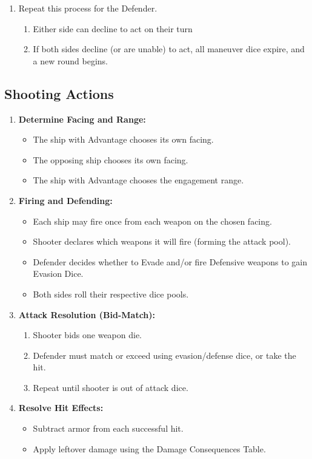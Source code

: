 \documentclass[11pt]{article}
\begin{document}
\begin{enumerate}
    \item Repeat this process for the Defender.
	\begin{enumerate}
		\item Either side can decline to act on their turn
		\item If both sides decline (or are unable) to act, all maneuver dice expire, and a new round begins.
	\end{enumerate}
\end{enumerate}

\subsection{Shooting Actions}

\begin{enumerate}
    \item \textbf{Determine Facing and Range:}
    \begin{itemize}
        \item The ship with Advantage chooses its own facing.
        \item The opposing ship chooses its own facing.
		\item The ship with Advantage chooses the engagement range.
    \end{itemize}

    \item \textbf{Firing and Defending:}
    \begin{itemize}
        \item Each ship may fire once from each weapon on the chosen facing.
        \item Shooter declares which weapons it will fire (forming the attack pool).
        \item Defender decides whether to Evade and/or fire Defensive weapons to gain Evasion Dice.
        \item Both sides roll their respective dice pools.
    \end{itemize}

    \item \textbf{Attack Resolution (Bid-Match):}
    \begin{enumerate}
        \item Shooter bids one weapon die.
        \item Defender must match or exceed using evasion/defense dice, or take the hit.
        \item Repeat until shooter is out of attack dice.
    \end{enumerate}

    \item \textbf{Resolve Hit Effects:}
    \begin{itemize}
        \item Subtract armor from each successful hit.
        \item Apply leftover damage using the Damage Consequences Table.
    \end{itemize}
\end{enumerate}
\end{document}
